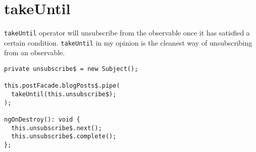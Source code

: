 \section{takeUntil}
\lstinline{takeUntil} operator will unsubscribe from the observable once it 
has satisfied a certain condition. \lstinline{takeUntil} in my opinion is the 
cleanest way of unsubscribing from an observable. 

\begin{lstlisting}[caption=blog.component.ts]
private unsubscribe$ = new Subject();

this.postFacade.blogPosts$.pipe(
  takeUntil(this.unsubscribe$);
);

ngOnDestroy(): void {
  this.unsubscribe$.next();
  this.unsubscribe$.complete();
};
\end{lstlisting}